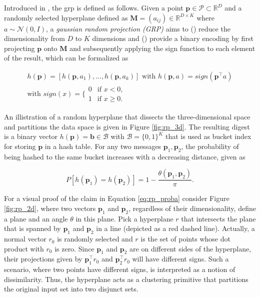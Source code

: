 \documentclass[../../../main.tex]{subfiles}
\begin{document}
Introduced in \cite{charikar2002similarity}, the \gls{grp} is defined as follows. Given a point $\bm{p} \in \mathcal{P} \subset \mathbb{R}^D$ and a randomly selected hyperplane defined as $\bm{M}=(a_{ij}) \in \mathbb{R}^{D \times K}$ where $a \sim \mathcal{N}(0, I)$, a \textit{gaussian random projection (GRP)} aims to () reduce the dimensionality from $D$ to $K$ dimensions and () provide a binary encoding by first projecting $\bm{p}$ onto $\bm{M}$ and subsequently applying the sign function to each element of the result, which can be formalized as

\begin{gather}\label{eq:grp_sign}
    h(\bm{p}) = [h(\bm{p}, a_1), \dots, h(\bm{p}, a_k)] \text{ with } h(\bm{p}, a) = sign(\bm{p}^\top a) \\
    \text{with } sign(x) = \Biggl\{ \begin{array}{lc}
        0 & \text{if } x < 0, \\
        1 & \text{if } x \geq 0.
    \end{array}
\end{gather}

An illistration of a random hyperplane that dissects the three-dimensional space and partitions the data space is given in Figure \ref{fig:rp_3d}. The resulting digest is a binary vector $h(\bm{p}) = \bm{b} \in \mathcal{B}$ with $\mathcal{B} = \{0, 1\}^K$ that is used as bucket index for storing $\bm{p}$ in a hash table. For any two messages $\bm{p}_1, \bm{p}_2$, the probability of being hashed to the same bucket increases with a decreasing distance, given as

\begin{equation}\label{eq:rp_proba}
    P[h(\bm{p}_1) = h(\bm{p}_2)] = 1 - \frac{\theta(\bm{p}_1, \bm{p}_2)}{\pi}.
\end{equation}

For a visual proof of the claim in Equation \ref{eq:rp_proba} consider Figure \ref{fig:rp_2d}, where two vectors $\bm{p}_1$ and $\bm{p}_2$, regardless of their dimensionality, define a plane and an angle $\theta$ in this plane. Pick a hyperplane $r$ that intersects the plane that is spanned by $\bm{p}_1$ and $\bm{p}_2$ in a line (depicted as a red dashed line). Actually, a normal vector $r_0$ is randomly selected and $r$ is the set of points whose dot product with $r_0$ is zero. Since $\bm{p}_1$ and $\bm{p}_2$ are on different sides of the hyperplane, their projections given by $\bm{p}_1^\top r_0$ and  $\bm{p}_2^\top r_0$ will have different signs. Such a scenario, where two points have different signs, is interpreted as a notion of dissimilarity. Thus, the hyperplane acts as a clustering primitive that partitions the original input set into two disjunct sets.
\end{document}
